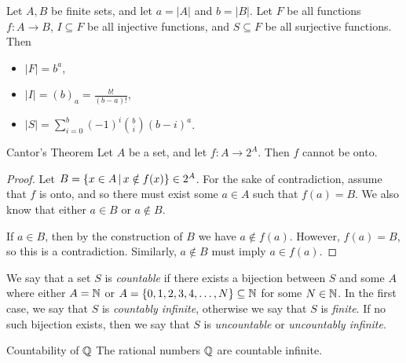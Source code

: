 \begin{prop}
    Let $A, B$ be finite sets, and let $a = |A|$ and $b = |B|$. Let $F$ be all functions $f: A \to B$, $I \subseteq F$ be all injective functions, and $S \subseteq F$ be all surjective functions. Then
    \begin{itemize}
        \item $|F| = b^a$,
        \item $|I| = (b)_a = \frac{b!}{(b-a)!}$,
        \item $|S| = \sum_{i=0}^b(-1)^i\binom{b}{i}(b-i)^a$.
    \end{itemize}
\end{prop}

\begin{thm}{Cantor's Theorem}\label{cantors-theorem}
    Let $A$ be a set, and let $f: A \to 2^A$. Then $f$ cannot be onto.
\end{thm}

\begin{proof}
    Let $B = \left\{x \in A \,\middle|\, x \notin f(x) \right\} \in 2^A$. For the sake of contradiction, assume that $f$ is onto, and so there must exist some $a \in A$ such that $f(a) = B$. We also know that either $a \in B$ or $a \notin B$.

    If $a \in B$, then by the construction of $B$ we have $a \notin f(a)$. However, $f(a) = B$, so this is a contradiction. Similarly, $a \notin B$ must imply $a \in f(a)$.
\end{proof}

\begin{defn}
    We say that a set $S$ is \emph{countable} if there exists a bijection between $S$ and some $A$ where either $A = \mathbb{N}$ or $A = \{0, 1, 2, 3, 4, \ldots, N\} \subseteq \mathbb{N}$ for some $N \in \mathbb{N}$. In the first case, we say that $S$ is \emph{countably infinite}, otherwise we say that $S$ is \emph{finite}. If no such bijection exists, then we say that $S$ is \emph{uncountable} or \emph{uncountably infinite}.
\end{defn}

\begin{thm}{Countability of $\mathbb{Q}$}\label{rationals-countable}\proofbreak
    The rational numbers $\mathbb{Q}$ are countable infinite.
\end{thm}

